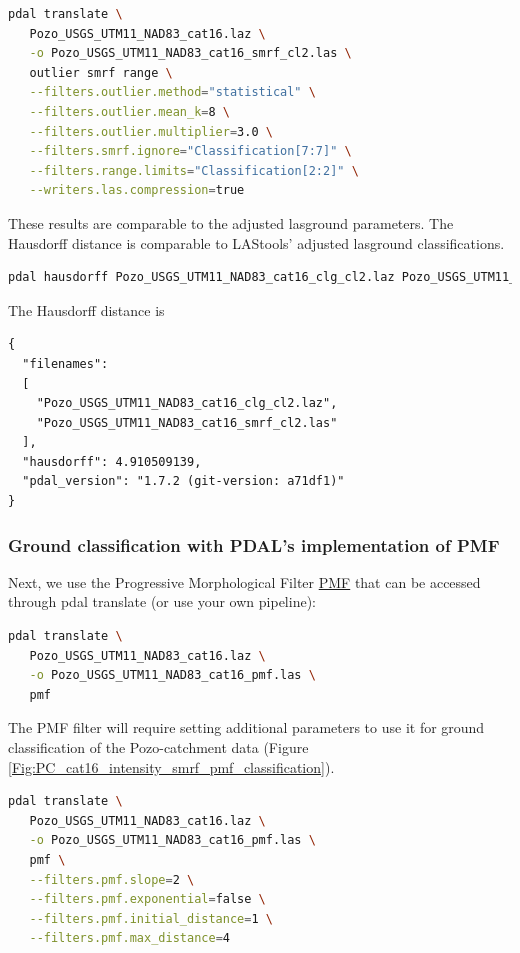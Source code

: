 \documentclass[a4paperpaper,,tablecaptionabove]{scrartcl}
\begin{document}
\begin{lstlisting}[language=bash]
pdal translate \
   Pozo_USGS_UTM11_NAD83_cat16.laz \
   -o Pozo_USGS_UTM11_NAD83_cat16_smrf_cl2.las \
   outlier smrf range \
   --filters.outlier.method="statistical" \
   --filters.outlier.mean_k=8 \
   --filters.outlier.multiplier=3.0 \
   --filters.smrf.ignore="Classification[7:7]" \
   --filters.range.limits="Classification[2:2]" \
   --writers.las.compression=true
\end{lstlisting}

These results are comparable to the adjusted lasground parameters. The
Hausdorff distance is comparable to LAStools' adjusted lasground
classifications.

\begin{lstlisting}[language=bash]
pdal hausdorff Pozo_USGS_UTM11_NAD83_cat16_clg_cl2.laz Pozo_USGS_UTM11_NAD83_cat16_smrf_cl2.las
\end{lstlisting}

The Hausdorff distance is

\begin{lstlisting}
{
  "filenames":
  [
    "Pozo_USGS_UTM11_NAD83_cat16_clg_cl2.laz",
    "Pozo_USGS_UTM11_NAD83_cat16_smrf_cl2.las"
  ],
  "hausdorff": 4.910509139,
  "pdal_version": "1.7.2 (git-version: a71df1)"
}
\end{lstlisting}

\hypertarget{ground-classification-with-pdals-implementation-of-pmf}{%
\subsubsection{Ground classification with PDAL's implementation of
PMF}\label{ground-classification-with-pdals-implementation-of-pmf}}

Next, we use the Progressive Morphological Filter
\href{https://pdal.io/stages/filters.pmf.html\#filters-pmf}{PMF} that
can be accessed through pdal translate (or use your own pipeline):

\begin{lstlisting}[language=bash]
pdal translate \
   Pozo_USGS_UTM11_NAD83_cat16.laz \
   -o Pozo_USGS_UTM11_NAD83_cat16_pmf.las \
   pmf 
\end{lstlisting}

The PMF filter will require setting additional parameters to use it for
ground classification of the Pozo-catchment data (Figure
\ref{Fig:PC_cat16_intensity_smrf_pmf_classification}).

\begin{lstlisting}[language=bash]
pdal translate \
   Pozo_USGS_UTM11_NAD83_cat16.laz \
   -o Pozo_USGS_UTM11_NAD83_cat16_pmf.las \
   pmf \
   --filters.pmf.slope=2 \
   --filters.pmf.exponential=false \
   --filters.pmf.initial_distance=1 \
   --filters.pmf.max_distance=4
\end{lstlisting}
\end{document}
